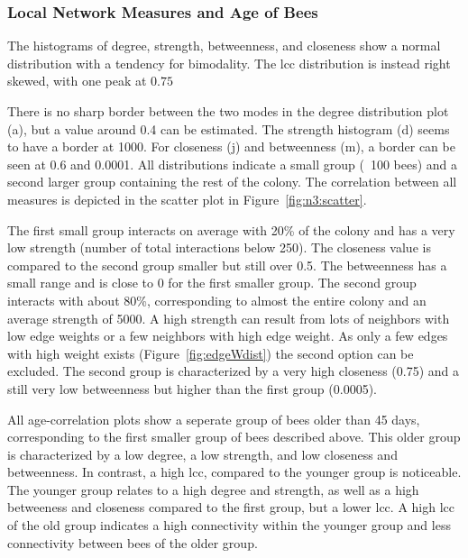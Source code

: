 \subsubsection{Local Network Measures and Age of Bees}
The histograms of degree, strength, betweenness, and closeness show a normal distribution with a tendency for bimodality. The lcc distribution is instead right skewed, with one peak at $0.75$

There is no sharp border between the two modes in the degree distribution plot (a), but a value around 0.4 can be estimated.
The strength histogram (d) seems to have a border at 1000.
For closeness (j) and betweenness (m), a border can be seen at 0.6 and 0.0001.
All distributions indicate a small group (~100 bees) and a second larger group containing the rest of the colony. The correlation between all measures is depicted in the scatter plot in Figure~\ref{fig:n3:scatter}.  

The first small group interacts on average with 20\% of the colony and has a very low strength (number of total interactions below 250). The closeness value is compared to the second group smaller but still over 0.5. The betweenness has a small range and is close to 0 for the first smaller group.
The second group interacts with about 80\%, corresponding to almost the entire colony and an average strength of 5000. A high strength can result from lots of neighbors with low edge weights or a few neighbors with high edge weight. As only a few edges with high weight exists (Figure~\ref{fig:edgeWdist}) the second option can be excluded. The second group is characterized by a very high closeness (0.75) and a still very low betweenness but higher than the first group (0.0005).

All age-correlation plots show a seperate group of bees older than 45 days, corresponding to the first smaller group of bees described above.
This older group is characterized by a low degree, a low strength, and low closeness and betweenness. In contrast, a high lcc, compared to the younger group is noticeable.
The younger group relates to a high degree and strength, as well as a high betweeness and closeness compared to the first group, but a lower lcc.
A high lcc of the old group indicates a high connectivity within the younger group and less connectivity between bees of the older group.

